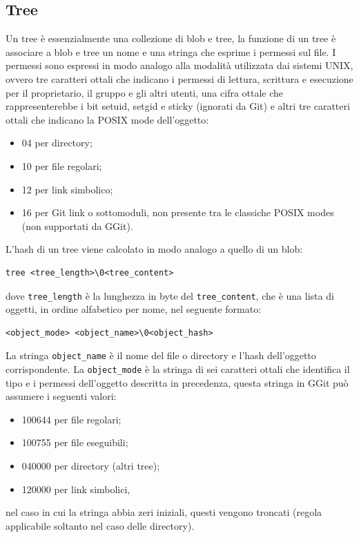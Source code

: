 \subsection{Tree}
Un tree è essenzialmente una collezione di blob e tree, la funzione di un tree è associare a blob e tree un nome e una stringa che esprime i permessi sul file.
I permessi sono espressi in modo analogo alla modalità utilizzata dai sistemi UNIX, ovvero tre caratteri ottali che indicano i permessi di lettura, scrittura e esecuzione per il proprietario, il gruppo e gli altri utenti, una cifra ottale che rappresenterebbe i bit setuid, setgid e sticky (ignorati da Git) e altri tre caratteri ottali che indicano la POSIX mode\cite{gitmodes} dell'oggetto:
\begin{itemize}
    \item 04 per directory;
    \item 10 per file regolari;
    \item 12 per link simbolico;
    \item 16 per Git link o sottomoduli, non presente tra le classiche POSIX modes (non supportati da GGit).
\end{itemize}
L'hash di un tree viene calcolato in modo analogo a quello di un blob:
\begin{verbatim}
tree <tree_length>\0<tree_content>
\end{verbatim}
dove \texttt{tree\_length} è la lunghezza in byte del \texttt{tree\_content}, che è una lista di oggetti, in ordine alfabetico per nome, nel seguente formato:
\begin{verbatim}
<object_mode> <object_name>\0<object_hash>
\end{verbatim}
La stringa \texttt{object\_name} è il nome del file o directory e  l'hash dell'oggetto corrispondente.
La \texttt{object\_mode} è la stringa di sei caratteri ottali che identifica il tipo e i permessi dell'oggetto descritta in precedenza, questa stringa in GGit può assumere i seguenti valori:
\begin{itemize}
    \item 100644 per file regolari;
    \item 100755 per file eseguibili;
    \item 040000 per directory (altri tree);
    \item 120000 per link simbolici,
\end{itemize}
nel caso in cui la stringa abbia zeri iniziali, questi vengono troncati (regola applicabile soltanto nel caso delle directory).
